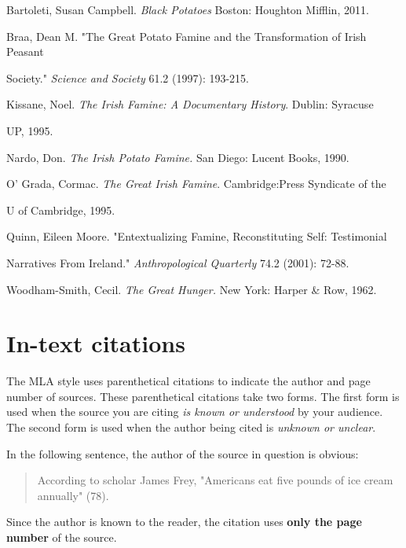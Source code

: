 \begin{Spacing}{1.5}
Bartoleti, Susan Campbell. \emph{Black Potatoes} Boston: Houghton Mifflin, 2011.

Braa, Dean M. "The Great Potato Famine and the Transformation of Irish Peasant 

\hspace{.4in}Society." \emph{Science and Society} 61.2 (1997): 193-215.

Kissane, Noel. \emph{The Irish Famine: A Documentary History}. Dublin: Syracuse 

\hspace{.4in}UP, 1995.

Nardo, Don. \emph{The Irish Potato Famine.} San Diego: Lucent Books, 1990.

O' Grada, Cormac. \emph{The Great Irish Famine}. Cambridge:Press Syndicate of the 

\hspace{.4in} U of Cambridge, 1995.

Quinn, Eileen Moore. "Entextualizing Famine, Reconstituting Self: Testimonial 

\hspace{.4in}Narratives From Ireland." \emph{Anthropological Quarterly} 74.2 (2001): 72-88.

Woodham-Smith, Cecil.  \emph{The Great Hunger.} New York: Harper \& Row, 1962.


\end{Spacing}

\newpage

\section{In-text citations}
The MLA style uses parenthetical citations to indicate the author and page number of 
sources. These parenthetical citations take two forms. The first form is used when the 
source you are citing \emph{is known or understood} by your audience. The second 
form is used when the author being cited is \emph{unknown or unclear}. 

In the following sentence, the author of the source in question is obvious:

\begin{quote}According to scholar James Frey, "Americans eat five pounds of ice cream 
annually" (78).
\end{quote}

Since the author is known to the reader, the citation uses \textbf{only the page 
number} of the source.

